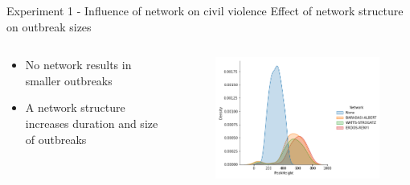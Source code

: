 \documentclass[10pt]{beamer}
\begin{document}
    \begin{frame}{Experiment 1 - Influence of network on civil violence}
        \large Effect of network structure on outbreak sizes
        \begin{columns}
            \begin{column}{.4\textwidth}
                \begin{itemize}
                    \item No network results in smaller outbreaks
                    \item A network structure increases duration and size of outbreaks
                \end{itemize}
            \end{column}
            \begin{column}{.6\textwidth}
                \begin{figure}
                    \centering
                    \includegraphics[width=.9\textwidth]{pictures/network_comparison/WithoutRemoveInfluencerDensity.png}
                \end{figure}
            \end{column}
        \end{columns}
    \end{frame}
\end{document}
